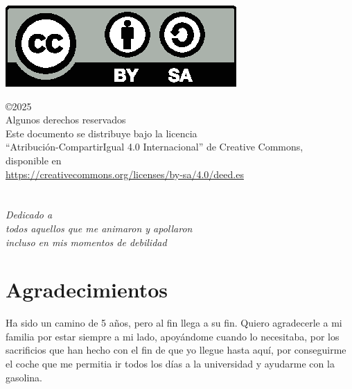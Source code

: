 \documentclass[a4paper, 12pt]{book}
\makeatletter
\let\theauthor\@author
\makeatother
\begin{document}
\begin{flushright}
	\includegraphics[scale=0.6]{img/by-sa}

	\noindent©2025 \theauthor  \\
	Algunos derechos reservados  \\
	Este documento se distribuye bajo la licencia \\
	``Atribución-CompartirIgual 4.0 Internacional'' de Creative Commons, \\
	disponible en \\
	\url{https://creativecommons.org/licenses/by-sa/4.0/deed.es}
\end{flushright}


\chapter*{}
\begin{flushright}
	\textit{Dedicado a \\
		todos aquellos que me animaron y apollaron \\
		incluso en mis momentos de debilidad}
\end{flushright}


\chapter*{Agradecimientos}
Ha sido un camino de 5 años, pero al fin llega a su fin. Quiero agradecerle a mi familia por estar siempre a mi lado, apoyándome cuando lo necesitaba, por los sacrificios que han hecho con el fin de que yo llegue hasta aquí, por conseguirme el coche que me permitia ir todos los días a la universidad y ayudarme con la gasolina. 
\end{document}
